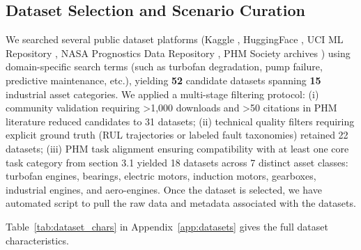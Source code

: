 \documentclass[sigconf,review]{acmart}
\begin{document}
\subsection{Dataset Selection and Scenario Curation} 
We searched several public dataset platforms (Kaggle \cite{kaggle_datasets}, HuggingFace \cite{huggingface_datasets}, UCI ML Repository \cite{UCI_ML_Repo}, NASA Prognostics Data Repository \cite{NASA_Prognostics_Data}, PHM Society archives \cite{PHM_Society_Archives}) using domain-specific search terms (such as turbofan degradation, pump failure, predictive maintenance, etc.), yielding \textbf{52} candidate datasets spanning \textbf{15} industrial asset categories. We applied a multi-stage filtering protocol: (i) community validation requiring >1,000 downloads and >50 citations in PHM literature reduced candidates to 31 datasets; (ii) technical quality filters requiring explicit ground truth (RUL trajectories or labeled fault taxonomies) retained 22 datasets; (iii) PHM task alignment ensuring compatibility with at least one core task category from section 3.1 yielded 18 datasets across 7 distinct asset classes: turbofan engines, bearings, electric motors, induction motors, gearboxes, industrial engines, and aero-engines. Once the dataset is selected, we have automated script to pull the raw data and metadata associated with the datasets. 

Table~\ref{tab:dataset_chars} in Appendix~\ref{app:datasets} gives the full dataset characteristics.

\end{document}
